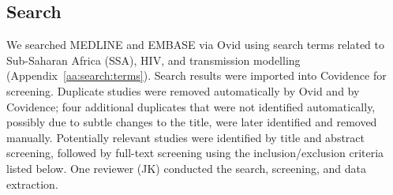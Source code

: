 \subsection{Search}
\label{ss:meth:search}
We searched MEDLINE and EMBASE via Ovid
using search terms related to Sub-Saharan Africa (SSA), HIV, and transmission modelling
(Appendix~\ref{aa:search:terms}).
Search results were imported into Covidence\cite{Covidence} for screening.
Duplicate studies were removed automatically by Ovid and by Covidence;
four additional duplicates that were not identified automatically,
possibly due to subtle changes to the title, were later identified and removed manually.
Potentially relevant studies were identified by title and abstract screening, followed 
by full-text screening using the inclusion/exclusion criteria listed below. 
One reviewer (JK) conducted the search, screening, and data extraction.
